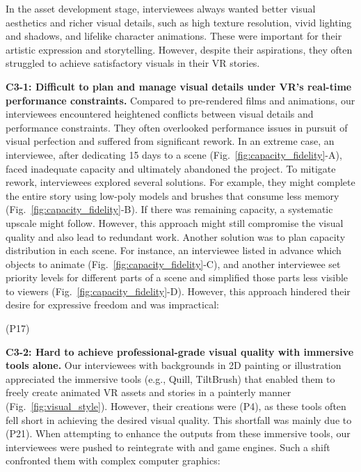 In the asset development stage, interviewees always wanted better visual aesthetics and richer visual details, such as high texture resolution, vivid lighting and shadows, and lifelike character animations. These were important for their artistic expression and storytelling. However, despite their aspirations, they often struggled to achieve satisfactory visuals in their VR stories.

\textbf{C3-1: Difficult to plan and manage visual details under VR’s real-time performance constraints.}
Compared to pre-rendered films and animations, our interviewees encountered heightened conflicts between visual details and performance constraints. 
They often overlooked performance issues in pursuit of visual perfection and suffered from significant rework. In an extreme case, an interviewee, after dedicating 15 days to a scene (Fig.~\ref{fig:capacity_fidelity}-A), faced inadequate capacity and ultimately abandoned the project.
To mitigate rework, interviewees explored several solutions. 
For example, they might complete the entire story using low-poly models and brushes that consume less memory (Fig.~\ref{fig:capacity_fidelity}-B). If there was remaining capacity, a systematic upscale might follow. However, this approach might still compromise the visual quality and also lead to redundant work.
Another solution was to plan capacity distribution in each scene. For instance, an interviewee listed in advance which objects to animate (Fig.~\ref{fig:capacity_fidelity}-C), and another interviewee set priority levels for different parts of a scene and simplified those parts less visible to viewers (Fig.~\ref{fig:capacity_fidelity}-D). 
However, this approach hindered their desire for expressive freedom and was impractical: 

 (P17)


\textbf{C3-2: Hard to achieve professional-grade visual quality with immersive tools alone.}
Our interviewees with backgrounds in 2D painting or illustration appreciated the immersive tools (e.g., Quill, TiltBrush) that enabled them to freely create animated VR assets and stories in a painterly manner (Fig.~\ref{fig:visual_style}). However, their creations were  (P4), as these tools often fell short in achieving the desired visual quality. This shortfall was mainly due to  (P21). When attempting to enhance the outputs from these immersive tools, our interviewees were pushed to reintegrate with  and game engines. Such a shift confronted them with complex computer graphics:

